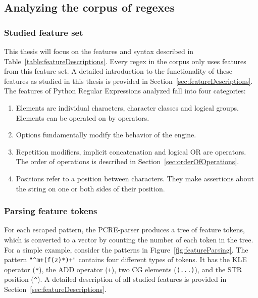 \subsection{Analyzing the corpus of regexes}
\label{sec:corpusAnalyzing}

\subsubsection{Studied feature set}



This thesis will focus on the features and syntax described in Table~\ref{table:featureDescriptions}.  Every regex in the corpus only uses features from this feature set.  A detailed introduction to the functionality of these features as studied in this thesis is provided in Section~\ref{sec:featureDescriptions}.  The features of Python Regular Expressions analyzed fall into four categories:

\begin{enumerate} \itemsep -1pt
\item{Elements are individual characters, character classes and logical groups.  Elements can be operated on by operators.}
\item{Options fundamentally modify the behavior of the engine.}
\item{Repetition modifiers, implicit concatenation and logical OR are operators. The order of operations is described in Section~\ref{sec:orderOfOperations}}.
\item{Positions refer to a position between characters.  They make assertions about the string on one or both sides of their position.}
\end{enumerate}

\subsubsection{Parsing feature tokens}
For each escaped pattern, the PCRE-parser produces a tree of feature tokens, which is converted to a vector by counting the number of each token in the tree.  For a simple example, consider the patterns in Figure~\ref{fig:featureParsing}.  The pattern \verb!"^m+(f(z)*)+"! contains four different types of tokens. It has the KLE operator (\verb!*!), the ADD operator (\verb!+!), two CG elements (\verb!(...)!), and the STR position (\verb!^!). A detailed description of all studied features is provided in Section~\ref{sec:featureDescriptions}.

